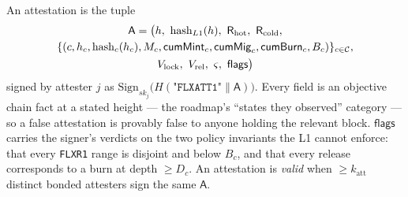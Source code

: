\begin{definition}[Attestation]
\label{def:attestation}
An attestation is the tuple
\begin{multline*}
\mathsf{A} = \big(\hgt,\ \mathrm{hash}_{L1}(\hgt),\ \mathsf{R}_{\mathrm{hot}},\ \mathsf{R}_{\mathrm{cold}}, \\
\{(c, h_c, \mathrm{hash}_c(h_c), M_c, \mathsf{cumMint}_c, \mathsf{cumMig}_c, \mathsf{cumBurn}_c, B_c)\}_{c \in \mathcal{C}}, \\
V_{\mathrm{lock}},\ V_{\mathrm{rel}},\ \varsigma,\ \mathsf{flags}\big)
\end{multline*}
signed by attester $j$ as $\mathrm{Sign}_{sk_j}\!\big(H(\texttt{"FLXATT1"} \| \mathsf{A})\big)$.
Every field is an objective chain fact at a stated height --- the roadmap's ``states they observed''
category  --- so a false attestation is provably false to
anyone holding the relevant block. $\mathsf{flags}$ carries the signer's verdicts on the two policy
invariants the L1 cannot enforce: that every \texttt{FLXR1} range is disjoint and below $B_c$, and
that every release corresponds to a burn at depth $\ge D_c$. An attestation is \emph{valid} when
$\ge k_{\mathrm{att}}$ distinct bonded attesters sign the same $\mathsf{A}$. \planned
\end{definition}

